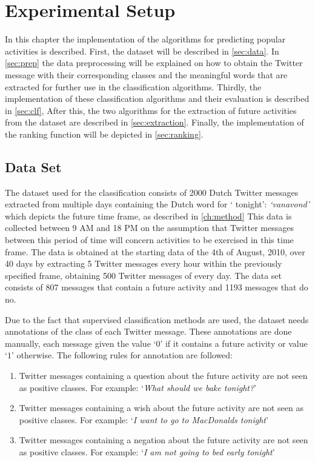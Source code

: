 \chapter{Experimental Setup} %
\label{ch:impl} %
In this chapter the implementation of the algorithms for predicting popular activities is described. First, the dataset will be described in \autoref{sec:data}. In \autoref{sec:prep} the data preprocessing will be explained on how to obtain the Twitter message with their corresponding classes and the meaningful words that are extracted for further use in the classification algorithms. Thirdly, the implementation of these classification algorithms and their evaluation is described in \autoref{sec:clf}, After this, the two algorithms for the extraction of future activities from the dataset are described in \autoref{sec:extraction}. Finally, the implementation of the ranking function will be depicted in \autoref{sec:ranking}.

\section{Data Set}\label{sec:data}
The dataset used for the classification consists of 2000 Dutch Twitter messages extracted from multiple days containing the Dutch word for ` tonight': \textit{`vanavond'} which depicts the future time frame, as described in \autoref{ch:method} This data is collected between 9 AM and 18 PM on the assumption that Twitter messages between this period of time will concern activities to be exercised in this time frame. The data is obtained at the starting data of the 4th of August, 2010, over 40 days by extracting 5 Twitter messages every hour within the previously specified frame, obtaining 500 Twitter messages of every day. The data set consists of 807 messages that contain a future activity and 1193 messages that do no.

Due to the fact that supervised classification methods are used, the dataset needs annotations of the class of each Twitter message. These annotations are done manually, each message given the value `$0$' if it contains a future activity or value `$1$' otherwise. The following rules for annotation are followed:
\begin{enumerate}
\item Twitter messages containing a question about the future activity are not seen as positive classes. For example: `\textit{What should we bake tonight?}'
\item Twitter messages containing a wish about the future activity are not seen as positive classes. For example: `\textit{I want to go to MacDonalds tonight}'
\item Twitter messages containing a negation about the future activity are not seen as positive classes. For example: `\textit{I am not going to bed early tonight}'
\end{enumerate}



